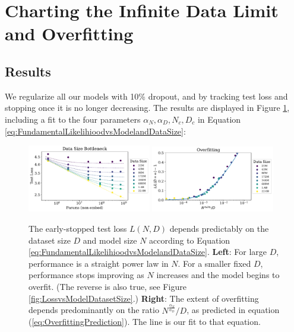 \documentclass[english]{article}
\begin{document}
\section{Charting the Infinite Data Limit and Overfitting}
\label{sec:ChartingOverfitting}

\subsection{Results}

We regularize all our models with 10\% dropout, and by tracking test loss and stopping once it is no longer decreasing.   The results are displayed in Figure \ref{fig:DatasetModelSizevsPerformance}, including a fit to the four parameters $\alpha_N, \alpha_D, N_c, D_c$ in Equation \eqref{eq:FundamentalLikelihioodvsModelandDataSize}:

\begin{figure}
\noindent \centering{} 
\includegraphics[width=0.48\textwidth]{DatasetModelSizevsPerformance}\hfill
\includegraphics[width=0.48\textwidth]{DatasetModelSizevsChangePerformance}
\caption[Universality of overfitting]{
The early-stopped test loss $L(N, D)$ depends predictably on the dataset size $D$ and model size $N$ according to Equation \eqref{eq:FundamentalLikelihioodvsModelandDataSize}.
{\bf Left}:
For large $D$, performance is a straight power law in $N$. For a smaller fixed $D$, performance stops improving as $N$ increases and the model begins to overfit. (The reverse is also true, see Figure \ref{fig:LossvsModelDatasetSize}.)
{\bf Right}:  The extent of overfitting depends predominantly on the ratio $N^{\frac{\alpha_N}{\alpha_D}}/D$, as predicted in equation (\ref{eq:OverfittingPrediction}).  The line is our fit to that equation.
\label{fig:DatasetModelSizevsPerformance}}
\end{figure}
\end{document}
